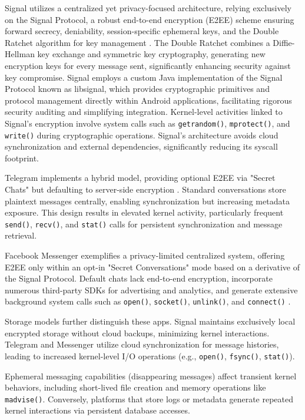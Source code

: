 \documentclass[a4paper,12pt]{report}
\begin{document}
Signal utilizes a centralized yet privacy-focused architecture, relying exclusively on the Signal Protocol, a robust end-to-end encryption (E2EE) scheme ensuring forward secrecy, deniability, session-specific ephemeral keys, and the Double Ratchet algorithm for key management \cite{signalwhitepaper}. The Double Ratchet combines a Diffie-Hellman key exchange and symmetric key cryptography, generating new encryption keys for every message sent, significantly enhancing security against key compromise. Signal employs a custom Java implementation of the Signal Protocol known as libsignal, which provides cryptographic primitives and protocol management directly within Android applications, facilitating rigorous security auditing and simplifying integration. Kernel-level activities linked to Signal’s encryption involve system calls such as \texttt{getrandom()}, \texttt{mprotect()}, and \texttt{write()} during cryptographic operations. Signal's architecture avoids cloud synchronization and external dependencies, significantly reducing its syscall footprint.

Telegram implements a hybrid model, providing optional E2EE via "Secret Chats" but defaulting to server-side encryption \cite{moltchanov2018telegram}. Standard conversations store plaintext messages centrally, enabling synchronization but increasing metadata exposure. This design results in elevated kernel activity, particularly frequent \texttt{send()}, \texttt{recv()}, and \texttt{stat()} calls for persistent synchronization and message retrieval.

Facebook Messenger exemplifies a privacy-limited centralized system, offering E2EE only within an opt-in "Secret Conversations" mode based on a derivative of the Signal Protocol. Default chats lack end-to-end encryption, incorporate numerous third-party SDKs for advertising and analytics, and generate extensive background system calls such as \texttt{open()}, \texttt{socket()}, \texttt{unlink()}, and \texttt{connect()} \cite{ShenVervierStringhini2021}.

Storage models further distinguish these apps. Signal maintains exclusively local encrypted storage without cloud backups, minimizing kernel interactions. Telegram and Messenger utilize cloud synchronization for message histories, leading to increased kernel-level I/O operations (e.g., \texttt{open()}, \texttt{fsync()}, \texttt{stat()}).

Ephemeral messaging capabilities (disappearing messages) affect transient kernel behaviors, including short-lived file creation and memory operations like \texttt{madvise()}. Conversely, platforms that store logs or metadata generate repeated kernel interactions via persistent database accesses.
\end{document}
